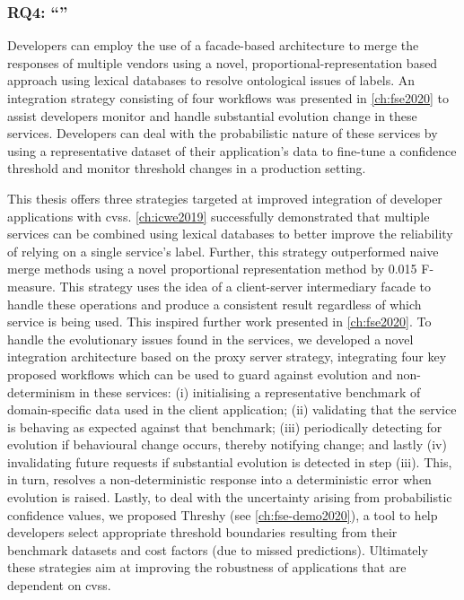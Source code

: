 \subsubsection*{RQ4: ``\RQFourDesign{}''}
\begin{callout}
Developers can employ the use of a facade-based architecture to merge the responses of \textup{multiple} vendors using a novel, proportional-representation based approach using lexical databases to resolve ontological issues of labels. An integration strategy consisting of four workflows was presented in \cref{ch:fse2020} to assist developers monitor and handle substantial evolution change in these services. Developers can deal with the probabilistic nature of these services by using a representative dataset of their application's data to fine-tune a confidence threshold and monitor threshold changes in a production setting.
\end{callout}

This thesis offers three strategies targeted at improved integration of developer applications with \glspl{cvs}. \cref{ch:icwe2019} successfully demonstrated that multiple services can be combined using lexical databases to better improve the reliability of relying on a single service's label. Further, this strategy outperformed naive merge methods using a novel proportional representation method by 0.015 F-measure. This strategy uses the idea of a client-server intermediary facade to handle these operations and produce a consistent result regardless of which service is being used. This inspired further work presented in \cref{ch:fse2020}. To handle the evolutionary issues found in the services, we developed a novel integration architecture based on the proxy server strategy, integrating four key proposed workflows which can be used to guard against evolution and non-determinism in these services: (i) initialising a representative benchmark of domain-specific data used in the client application; (ii) validating that the service is behaving as expected against that benchmark; (iii) periodically detecting for evolution if behavioural change occurs, thereby notifying change; and lastly (iv) invalidating future requests if substantial evolution is detected in step (iii). This, in turn, resolves a non-deterministic response into a deterministic error when evolution is raised. Lastly, to deal with the uncertainty arising from probabilistic confidence values, we proposed Threshy (see \cref{ch:fse-demo2020}), a tool to help developers select appropriate threshold boundaries resulting from their benchmark datasets and cost factors (due to missed predictions). Ultimately these strategies aim at improving the robustness of applications that are dependent on \glspl{cvs}.


